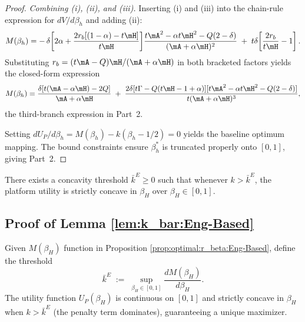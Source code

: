 \begin{proof}
\emph{Combining (i), (ii), and (iii).} Inserting (i) and (iii) into the chain-rule expression for $dV/d\beta_h$ and adding (ii):
\[
    M(\beta_h) = -\,\delta\!\left[2\alpha + \frac{2r_b[(1-\alpha) - t\mH]}{t\mH}\right]\!\frac{t\mA^2 - \alpha t\mH^2 - Q(2-\delta)}{(\mA+\alpha\mH)^2} \;+\; t\delta\!\left[\frac{2r_b}{t\mH} - 1\right].
\]
Substituting $r_b = (t\mA - Q)\mH/(\mA+\alpha\mH)$ in both bracketed factors yields the closed-form expression
\[
    M(\beta_h) = \frac{\delta[t(\mA-\alpha\mH) - 2Q]}{\mA+\alpha\mH} \;+\; \frac{2\delta[t\Gamma - Q(t\mH-1+\alpha)][t\mA^2 - \alpha t\mH^2 - Q(2-\delta)]}{t(\mA+\alpha\mH)^3},
\]
the third-branch expression in Part~2. 
 
Setting $dU_P/d\beta_h = M(\beta_h) - k(\beta_h - 1/2) = 0$ yields the baseline optimum mapping. The bound constraints ensure $\beta_h^*$ is truncated properly onto $[0,1]$, giving Part~2.
 
\end{proof}




\begin{lemma}\label{lem:k_bar:Eng-Based}
There exists a concavity threshold $\bar{k}^E\ge 0$ such that whenever $k>\bar{k}^E$, the platform utility is strictly concave in $\beta_H$ over $\beta_H \in [0,1]$.
\end{lemma}
\subsection*{Proof of Lemma \ref{lem:k_bar:Eng-Based}}
Given $M(\beta_H)$ function in Proposition \ref{prop:optimal:r_beta:Eng-Based}, define the threshold
\[
\bar{k}^{E} \;:=\; \sup_{\beta_H \in [0,1]} \frac{dM(\beta_H)}{d\beta_H}.
\] 
The utility function $U_P(\beta_H)$ is continuous on $[0,1]$ and strictly concave in $\beta_H$ when $k > \bar{k}^{E}$ (the penalty term dominates), guaranteeing a unique maximizer.


